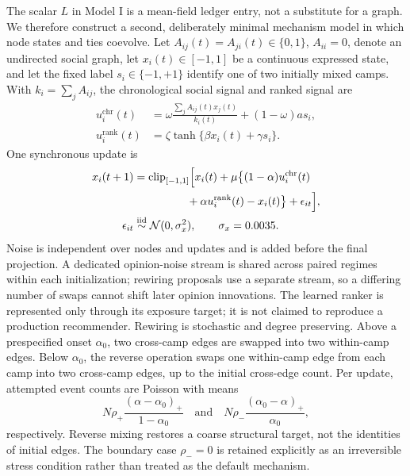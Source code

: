 \documentclass[pdflatex,sn-mathphys-num]{sn-jnl}
\begin{document}
The scalar $L$ in Model I is a mean-field ledger entry, not a substitute for a graph. We therefore construct a second, deliberately minimal mechanism model in which node states and ties coevolve. Let $A_{ij}(t)=A_{ji}(t)\in\{0,1\}$, $A_{ii}=0$, denote an undirected social graph, let $x_i(t)\in[-1,1]$ be a continuous expressed state, and let the fixed label $s_i\in\{-1,+1\}$ identify one of two initially mixed camps. With $k_i=\sum_jA_{ij}$, the chronological social signal and ranked signal are
\begin{align}
u_i^{\mathrm{chr}}(t)
 &=\omega\frac{\sum_jA_{ij}(t)x_j(t)}{k_i(t)}
 +(1-\omega)a s_i,\\
u_i^{\mathrm{rank}}(t)
 &=\zeta\tanh\{\beta x_i(t)+\gamma s_i\}.
\end{align}
One synchronous update is
\begin{equation}
\begin{aligned}
x_i(t+1)
&=\operatorname{clip}_{[-1,1]}\Bigl[x_i(t)
 +\mu\bigl\{(1-\alpha)u_i^{\mathrm{chr}}(t)\\
&\hspace{4.8em}+\alpha u_i^{\mathrm{rank}}(t)-x_i(t)\bigr\}
 +\epsilon_{it}\Bigr],\\
\epsilon_{it}&\overset{\mathrm{iid}}{\sim}\mathcal N(0,\sigma_x^2),
\qquad \sigma_x=0.0035.
\end{aligned}
\label{eq:network-opinion}
\end{equation}
Noise is independent over nodes and updates and is added before the final projection. A dedicated opinion-noise stream is shared across paired regimes within each initialization; rewiring proposals use a separate stream, so a differing number of swaps cannot shift later opinion innovations. The learned ranker is represented only through its exposure target; it is not claimed to reproduce a production recommender. Rewiring is stochastic and degree preserving. Above a prespecified onset $\alpha_0$, two cross-camp edges are swapped into two within-camp edges. Below $\alpha_0$, the reverse operation swaps one within-camp edge from each camp into two cross-camp edges, up to the initial cross-edge count. Per update, attempted event counts are Poisson with means
\begin{equation}
N\rho_+\frac{(\alpha-\alpha_0)_+}{1-\alpha_0}
\quad\text{and}\quad
N\rho_-\frac{(\alpha_0-\alpha)_+}{\alpha_0},
\label{eq:rewiring-intensity}
\end{equation}
respectively. Reverse mixing restores a coarse structural target, not the identities of initial edges. The boundary case $\rho_-=0$ is retained explicitly as an irreversible stress condition rather than treated as the default mechanism.
\end{document}
